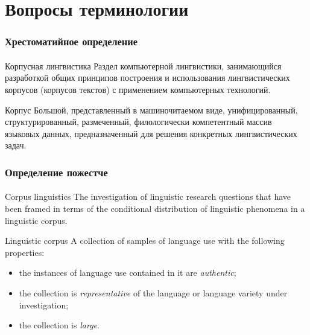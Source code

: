 

\frame{\titlepage}

\section{Вопросы терминологии}

\frame{\tableofcontents[currentsection]}

\begin{frame}
    \frametitle{Хрестоматийное определение}
    \framesubtitle{\autocite[7]{zakharov_bogdanova:2011}}

    \begin{block}{Корпусная лингвистика}
        Раздел компьютерной лингвистики, занимающийся разработкой общих принципов построения и использования лингвистических корпусов (корпусов текстов) с применением компьютерных технологий.
    \end{block}

    \vfill

    \begin{block}{Корпус}
        Большой, представленный в машиночитаемом виде, унифицированный, структурированный, размеченный, филологически компетентный массив языковых данных, предназначенный для решения конкретных лингвистических задач.
    \end{block}
\end{frame}

\begin{frame}
    \frametitle{Определение пожестче}
    \framesubtitle{\autocite[22--23, 56]{stefanowitsch:2020}}

    \begin{block}{Corpus linguistics}
        The investigation of linguistic research questions that have been framed in terms of the conditional distribution of linguistic phenomena in a linguistic corpus.
    \end{block}

    \vfill

    \begin{block}{Linguistic corpus}
        A collection of samples of language use with the following properties: \begin{itemize}
            \item the instances of language use contained in it are \textit{authentic};
            \item the collection is \textit{representative} of the language or language variety under investigation;
            \item the collection is \textit{large}.
        \end{itemize}
    \end{block}
\end{frame}

